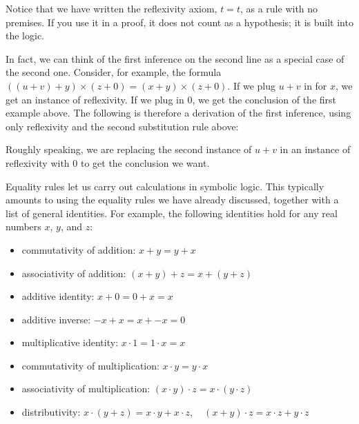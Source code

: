 \documentclass[letterpaper,10pt,english]{sphinxmanual}
\begin{document}
\sphinxAtStartPar
Notice that we have written the reflexivity axiom, \(t = t\), as a rule with no premises. If you use it in a proof, it does not count as a hypothesis; it is built into the logic.

\sphinxAtStartPar
In fact, we can think of the first inference on the second line as a special case of the second one. Consider, for example, the formula \(((u + v) + y) \times (z + 0) = (x + y) \times (z + 0)\). If we plug \(u + v\) in for \(x\), we get an instance of reflexivity. If we plug in \(0\), we get the conclusion of the first example above. The following is therefore a derivation of the first inference, using only reflexivity and the second substitution rule above:



\begin{center}
\AXM{}
\DP
\end{center}

\sphinxAtStartPar
Roughly speaking, we are replacing the second instance of \(u + v\) in an instance of reflexivity with \(0\) to get the conclusion we
want.

\sphinxAtStartPar
Equality rules let us carry out calculations in symbolic logic. This typically amounts to using the equality rules we have already discussed, together with a list of general identities. For example, the following identities hold for any real numbers \(x\), \(y\), and \(z\):
\begin{itemize}
\item {} 
\sphinxAtStartPar
commutativity of addition: \(x + y = y + x\)

\item {} 
\sphinxAtStartPar
associativity of addition: \((x + y) + z = x + (y + z)\)

\item {} 
\sphinxAtStartPar
additive identity: \(x + 0 = 0 + x = x\)

\item {} 
\sphinxAtStartPar
additive inverse: \(-x + x = x + -x = 0\)

\item {} 
\sphinxAtStartPar
multiplicative identity: \(x \cdot 1 = 1 \cdot x = x\)

\item {} 
\sphinxAtStartPar
commutativity of multiplication: \(x \cdot y = y \cdot x\)

\item {} 
\sphinxAtStartPar
associativity of multiplication: \((x \cdot y) \cdot z = x \cdot (y \cdot z)\)

\item {} 
\sphinxAtStartPar
distributivity: \(x \cdot (y + z) = x \cdot y + x \cdot z, \quad (x + y) \cdot z = x \cdot z + y \cdot z\)

\end{itemize}
\end{document}
